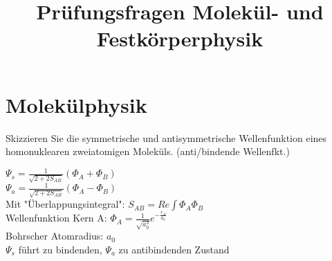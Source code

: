 \documentclass[a5paper,12pt,ngerman,print,grid=front]{kartei}
\title{Prüfungsfragen Molekül- und Festkörperphysik}
\begin{document}
\section*{Molekülphysik}



	\begin{karte}{
    	Skizzieren Sie die symmetrische und antisymmetrische Wellenfunktion eines 
        homonuklearen zweiatomigen Moleküls. (anti/bindende Wellenfkt.)
        }
      
		$\Psi_s=\frac{1}{\sqrt{2+2S_{AB}}}(\Phi_A+\Phi_B)$ \\
        
		$\Psi_a=\frac{1}{\sqrt{2+2S_{AB}}}(\Phi_A-\Phi_B)$ \\
        
		Mit "Überlappungsintegral": $S_{AB}=Re \int \Phi_A \Phi_B$ \\
        
		Wellenfunktion Kern A: $ \Phi_A= \frac{1}{\sqrt{a_0^3}}e^{-\frac{r_A}{a_0}}$ \\
        
        Bohrscher Atomradius: $a_0$ \\
        
        $\Psi_s$ führt zu bindenden, $\Psi_a$ zu antibindenden Zustand
        
    \end{karte}
\end{document}
